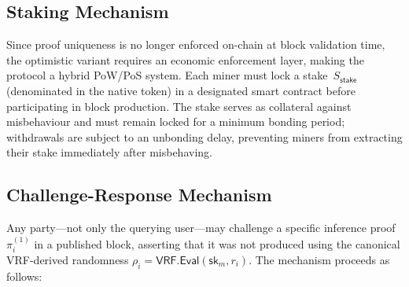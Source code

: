 \subsection{Staking Mechanism}

Since proof uniqueness is no longer enforced on-chain at block validation time, the optimistic variant requires an economic enforcement layer, making the protocol a hybrid PoW/PoS system. Each miner must lock a stake~$S_{\mathsf{stake}}$ (denominated in the native token) in a designated smart contract before participating in block production. The stake serves as collateral against misbehaviour and must remain locked for a minimum bonding period; withdrawals are subject to an unbonding delay, preventing miners from extracting their stake immediately after misbehaving.

\subsection{Challenge-Response Mechanism}

Any party---not only the querying user---may challenge a specific inference proof $\pi_i^{(1)}$ in a published block, asserting that it was not produced using the canonical VRF-derived randomness $\rho_i = \mathsf{VRF.Eval}(\mathsf{sk}_m, r_i)$. The mechanism proceeds as follows:

